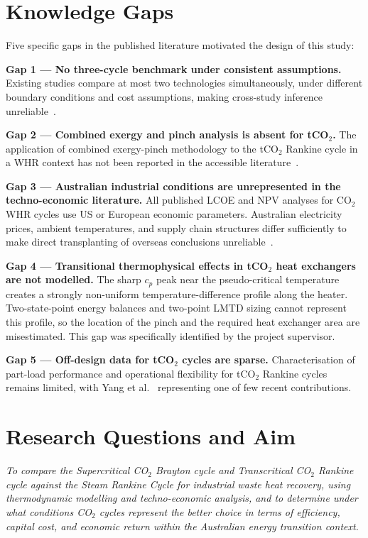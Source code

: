 \documentclass[12pt,a4paper]{report}
\begin{document}
\section{Knowledge Gaps}
\label{sec:knowledge_gap}

Five specific gaps in the published literature motivated the design of this
study:

\bigskip
\noindent\textbf{Gap 1 --- No three-cycle benchmark under consistent assumptions.}
Existing studies compare at most two technologies simultaneously, under
different boundary conditions and cost assumptions, making cross-study
inference unreliable~\cite{Jiang2023,Kizilkan2020,Baglietto2023}.

\bigskip
\noindent\textbf{Gap 2 --- Combined exergy and pinch analysis is absent for tCO$_2$.}
The application of combined exergy-pinch methodology to the tCO$_2$ Rankine
cycle in a WHR context has not been reported in the accessible
literature~\cite{Sarkar2009,Nami2017}.

\bigskip
\noindent\textbf{Gap 3 --- Australian industrial conditions are unrepresented
in the techno-economic literature.}
All published LCOE and NPV analyses for CO$_2$ WHR cycles use US or European
economic parameters. Australian electricity prices, ambient temperatures, and
supply chain structures differ sufficiently to make direct transplanting of
overseas conclusions unreliable~\cite{Papapetrou2018,ARENA2023}.

\bigskip
\noindent\textbf{Gap 4 --- Transitional thermophysical effects in tCO$_2$ heat
exchangers are not modelled.}
The sharp $c_p$ peak near the pseudo-critical temperature creates a strongly
non-uniform temperature-difference profile along the heater. Two-state-point
energy balances and two-point LMTD sizing cannot represent this profile, so
the location of the pinch and the required heat exchanger area are
misestimated. This gap was specifically identified by the project supervisor.

\bigskip
\noindent\textbf{Gap 5 --- Off-design data for tCO$_2$ cycles are sparse.}
Characterisation of part-load performance and operational flexibility for
tCO$_2$ Rankine cycles remains limited, with Yang et al.~\cite{Yang2024}
representing one of few recent contributions.

\section{Research Questions and Aim}
\label{sec:rqs}

\begin{mdframed}[linecolor=uqpurple,linewidth=1.5pt,
  backgroundcolor=uqpurple!5,roundcorner=4pt,
  innerleftmargin=12pt,innerrightmargin=12pt,
  innertopmargin=10pt,innerbottommargin=10pt]
\textit{To compare the Supercritical CO$_2$ Brayton cycle and Transcritical
CO$_2$ Rankine cycle against the Steam Rankine Cycle for industrial waste heat
recovery, using thermodynamic modelling and techno-economic analysis, and to
determine under what conditions CO$_2$ cycles represent the better choice in
terms of efficiency, capital cost, and economic return within the Australian
energy transition context.}
\end{mdframed}
\end{document}
